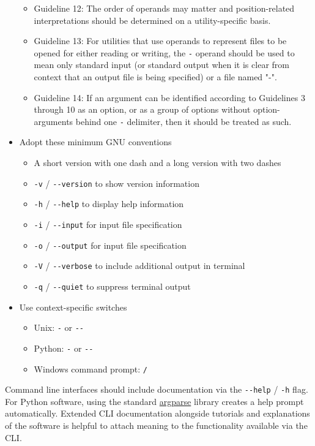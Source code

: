 \documentclass[]{nrel}
\begin{document}
\begin{itemize}
\begin{itemize}
\item Guideline 12: The order of operands may matter and position-related interpretations should be determined on a utility-specific basis.
\item Guideline 13: For utilities that use operands to represent files to be opened for either reading or writing, the \lstinline{-} operand should be used to mean only standard input (or standard output when it is clear from context that an output file is being specified) or a file named "-".
\item Guideline 14: If an argument can be identified according to Guidelines 3 through 10 as an option, or as a group of options without option-arguments behind one \lstinline{-} delimiter, then it should be treated as such.
\end{itemize}

\item Adopt these minimum GNU conventions
\begin{itemize}
\item A short version with one dash and a long version with two dashes
\item \lstinline{-v} / \lstinline{--version} to show version information
\item \lstinline{-h} / \lstinline{--help} to display help information
\item \lstinline{-i} / \lstinline{--input} for input file specification
\item \lstinline{-o} / \lstinline{--output} for input file specification
\item \lstinline{-V} / \lstinline{--verbose} to include additional output in terminal
\item \lstinline{-q} / \lstinline{--quiet} to suppress terminal output
\end{itemize}

\item Use context-specific switches
\begin{itemize}
\item Unix: \lstinline{-} or \lstinline{--}
\item Python: \lstinline{-} or \lstinline{--}
\item Windows command prompt: \lstinline{/}
\end{itemize}

\end{itemize}

Command line interfaces should include documentation via the \lstinline{--help} / \lstinline{-h} flag.
For Python software, using the standard \href{https://docs.python.org/3/library/argparse.html}{argparse}
library creates a help prompt automatically.
Extended CLI documentation alongside tutorials and explanations of the software is helpful to
attach meaning to the functionality available via the CLI.
\end{document}
